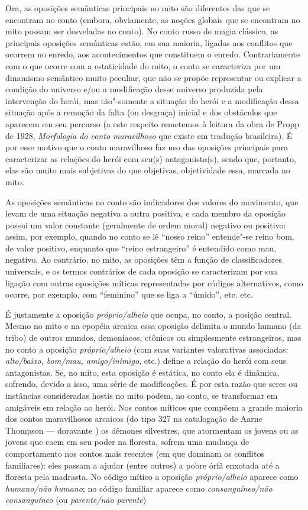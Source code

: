 Ora, as oposições semânticas principais no mito são diferentes das que
se encontram no conto (embora, obviamente, as noções globais que se
encontram no mito possam ser desveladas no conto). No conto russo de
magia clássico, as principais oposições semânticas estão, em sua
maioria, ligadas aos conflitos que ocorrem no enredo, aos
acontecimentos que constituem o enredo. Contrariamente com o que ocorre
com a estaticidade do mito, o conto se caracteriza por um dinamismo
semântico muito peculiar, que não se propõe representar ou explicar a
condição do universo e/ou a modificação desse universo produzida pela
intervenção do herói, mas tão"-somente a situação do herói e a
modificação dessa situação após a remoção da falta (ou desgraça)
inicial e dos obstáculos que aparecem em seu percurso (a este respeito
remetemos à leitura da obra de Propp de 1928, \emph{Morfologia do conto
maravilhoso} que existe em tradução brasileira). É por esse motivo que o
conto maravilhoso faz uso das oposições principais para caracterizar as
relações do herói com seu(s) antagonista(s), sendo que, portanto, elas
são muito mais subjetivas do que objetivas, objetividade essa, marcada
no mito.

As oposições semânticas no conto são indicadores dos valores do
movimento, que levam de uma situação negativa a outra positiva, e cada
membro da oposição possui um valor constante (geralmente de ordem
moral) negativo ou positivo: assim, por exemplo, quando no conto se lê ``nosso reino'' entende"-se reino bom, de valor positivo, enquanto que ``reino estrangeiro'' é entendido como mau, negativo. Ao contrário, no
mito, as oposições têm a função de classificadores universais, e os
termos contrários de cada oposição se caracterizam por sua ligação com
outras oposições míticas representadas por códigos alternativos, como
ocorre, por exemplo, com ``feminino'' que se liga a ``úmido'', etc.
etc.

É justamente a oposição \emph{próprio/alheio} que ocupa, no conto, a
posição central. Mesmo no mito e na epopéia arcaica essa oposição
delimita o mundo humano (da tribo) de outros mundos, demoníacos,
ctônicos ou simplesmente estrangeiros, mas no conto a
oposição \emph{próprio/alheio} (com suas variantes valorativas
associadas: \emph{alto/baixo, bom/mau,
amigo/inimigo}, etc.) define a relação do herói com seus
antagonistas. Se, no mito, esta oposição é estática, no conto ela é
dinâmica, sofrendo, devido a isso, uma série de modificações. É por esta
razão que seres ou instâncias consideradas hostis no mito podem, no
conto, se transformar em amigáveis em relação ao herói. Nos contos
míticos que compõem a grande maioria dos contos maravilhosos arcaicos
(do tipo 327 na catalogação de Aarne Thompson --- doravante ) os
dêmones silvestres, que atormentam os jovens ou as jovens que caem em
seu poder na floresta, sofrem uma mudança de comportamento nos contos
mais recentes (em que dominam os conflitos familiares): eles passam a
ajudar (entre outros) a pobre órfã enxotada até a floresta pela
madrasta. No código mítico a oposição \emph{próprio/alheio} aparece
como \emph{humano/não humano}; no código familiar aparece
como \emph{consanguíneo/não consanguíneo} (ou \emph{parente/não
parente})

